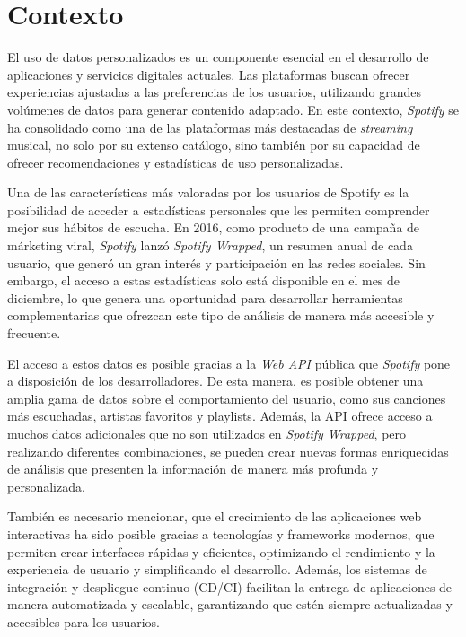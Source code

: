 \section{Contexto}

El uso de datos personalizados es un componente esencial en el desarrollo de aplicaciones y servicios digitales actuales. Las plataformas buscan ofrecer experiencias ajustadas a las preferencias de los usuarios, utilizando grandes volúmenes de datos para generar contenido adaptado. En este contexto, \textit{Spotify} se ha consolidado como una de las plataformas más destacadas de \textit{streaming} musical, no solo por su extenso catálogo, sino también por su capacidad de ofrecer recomendaciones y estadísticas de uso personalizadas.

Una de las características más valoradas por los usuarios de Spotify es la posibilidad de acceder a estadísticas personales que les permiten comprender mejor sus hábitos de escucha. En 2016, como producto de una campaña de márketing viral, \textit{Spotify} lanzó \textit{Spotify Wrapped}, un resumen anual de cada usuario, que generó un gran interés y participación en las redes sociales. Sin embargo, el acceso a estas estadísticas solo está disponible en el mes de diciembre, lo que genera una oportunidad para desarrollar herramientas complementarias que ofrezcan este tipo de análisis de manera más accesible y frecuente.

El acceso a estos datos es posible gracias a la \textit{Web API} pública que \textit{Spotify} pone a disposición de los desarrolladores. De esta manera, es posible obtener una amplia gama de datos sobre el comportamiento del usuario, como sus canciones más escuchadas, artistas favoritos y playlists. Además, la API ofrece acceso a muchos datos adicionales que no son utilizados en \textit{Spotify Wrapped}, pero realizando diferentes combinaciones, se pueden crear nuevas formas enriquecidas de análisis que presenten la información de manera más profunda y personalizada.

También es necesario mencionar, que el crecimiento de las aplicaciones web interactivas ha sido posible gracias a tecnologías y frameworks modernos, que permiten crear interfaces rápidas y eficientes, optimizando el
rendimiento y la experiencia de usuario y simplificando el desarrollo. Además, los sistemas de integración y despliegue continuo (CD/CI) facilitan la entrega de aplicaciones de manera automatizada y escalable, garantizando que estén siempre actualizadas y accesibles para los usuarios.

